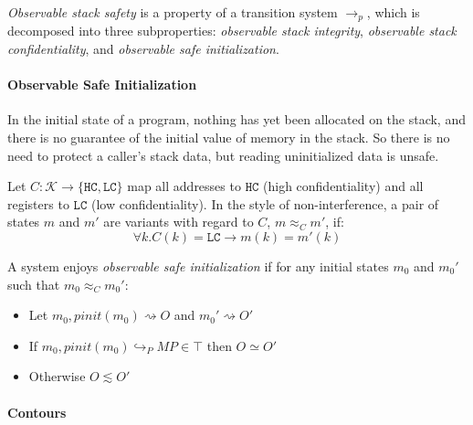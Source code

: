 \documentclass{article}
\begin{document}
    {\it Observable stack safety} is a property of a transition system \(\longrightarrow_p\),
    which is decomposed into three subproperties: {\it observable stack integrity},
    {\it observable stack confidentiality}, and {\it observable safe initialization}. 


    \paragraph{Observable Safe Initialization}

      In the initial state of a program, nothing has yet been allocated on the stack, and
      there is no guarantee of the initial value of memory in the stack. So there is no
      need to protect a caller's stack data, but reading uninitialized data is unsafe.

      Let \(C : \mathcal{K} \rightarrow \{\mathtt{HC},\mathtt{LC}\}\) map all addresses
      to \(\mathtt{HC}\) (high confidentiality) and all registers to \(\mathtt{LC}\)
      (low confidentiality). In the style of non-interference, a pair of states \(m\)
      and \(m'\) are variants with regard to \(C\), \(m \approx_C m'\), if:
      \[\forall k . C(k) = \mathtt{LC} \rightarrow m(k) = m'(k)\]
      
      A system enjoys {\it observable safe initialization} if for any initial states \(m_0\)
      and \(m_0'\) such that \(m_0 \approx_C m_0'\):

      \begin{itemize}
        \item Let \(m_0,\mathit{pinit}(m_0) \rightsquigarrow O\) and \(m_0' \rightsquigarrow O'\)
        \item If \(m_0,\mathit{pinit}(m_0) \hookrightarrow_P MP \in \top\) then \(O \simeq O'\)
        \item Otherwise \(O \lesssim O'\)
      \end{itemize}

    \paragraph{Contours}
\end{document}
